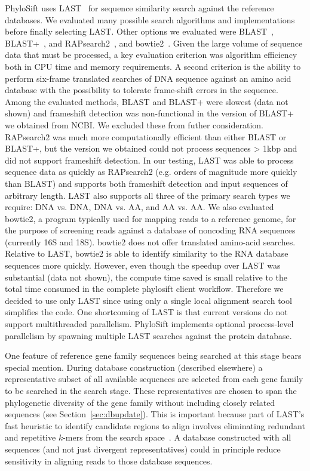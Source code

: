\documentclass[10pt]{article}
\begin{document}
PhyloSift uses LAST~\cite{Kiełbasa2011} for sequence similarity search against the reference databases.
We evaluated many possible search algorithms and implementations before finally selecting LAST. 
Other options we evaluated were BLAST~\cite{Altschul1997}, BLAST+~\cite{Camacho2009}, and RAPsearch2~\cite{Zhao2011}, and bowtie2~\cite{Langmead2009}.
Given the large volume of sequence data that must be processed, a key evaluation criterion was algorithm efficiency both in CPU time and memory requirements. 
A second criterion is the ability to perform six-frame translated searches of {DNA} sequence against an amino acid database with the possibility to tolerate frame-shift errors in the sequence.
Among the evaluated methods, BLAST and BLAST+ were slowest (data not shown) and frameshift detection was non-functional in the version of BLAST+ we obtained from NCBI. We excluded these from futher consideration.
RAPsearch2 was much more computationally efficient than either BLAST or BLAST+, but the version we obtained could not process sequences > 1kbp and did not support frameshift detection.
In our testing, LAST was able to process sequence data as quickly as RAPsearch2 (e.g. orders of magnitude more quickly than BLAST) and supports both frameshift detection and input sequences of arbitrary length.
LAST also supports all three of the primary search types we require: {DNA} vs. {DNA}, {DNA} vs. AA, and AA vs. AA.
We also evaluated bowtie2, a program typically used for mapping reads to a reference genome, for the purpose of screening reads against a database of noncoding {RNA} sequences (currently 16S and 18S).
bowtie2 does not offer translated amino-acid searches. 
Relative to LAST, bowtie2 is able to identify similarity to the {RNA} database sequences more quickly.
However, even though the speedup over LAST was substantial (data not shown), the compute time saved is small relative to the total time consumed in the complete phylosift client workflow.
Therefore we decided to use only LAST since using only a single local alignment search tool simplifies the code.
One shortcoming of LAST is that current versions do not support multithreaded parallelism.
PhyloSift implements optional process-level parallelism by spawning multiple LAST searches against the protein database.

One feature of reference gene family sequences being searched at this stage bears special mention.
During database construction (described elsewhere) a representative subset of all available sequences are selected from each gene family to be searched in the search stage.
These representatives are chosen to span the phylogenetic diversity of the gene family without including closely related sequences (see Section~\ref{sec:dbupdate}).
This is important because part of LAST's fast heuristic to identify candidate regions to align involves eliminating redundant and repetitive $k$-mers from the search space~\cite{Kiełbasa2011}.
A database constructed with all sequences (and not just divergent representatives) could in principle reduce sensitivity in aligning reads to those database sequences.
\end{document}
